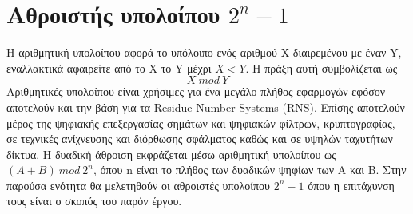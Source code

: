 \section{Αθροιστής υπολοίπου $2^n-1$}
\label{section:mod_addition}
Η αριθμητική υπολοίπου αφορά το υπόλοιπο ενός αριθμού X διαιρεμένου με έναν Y, εναλλακτικά
αφαιρείτε από το Χ το Y μέχρι $X < Y$. Η πράξη αυτή συμβολίζεται ως 
\begin{equation*}
    X\ mod\ Y
\end{equation*}
Αριθμητικές υπολοίπου είναι χρήσιμες για ένα μεγάλο πλήθος εφαρμογών εφόσον αποτελούν και 
την βάση για τα Residue Number Systems (RNS). Επίσης αποτελούν μέρος της ψηφιακής
επεξεργασίας σημάτων και ψηφιακών φίλτρων, κρυπτογραφίας, σε τεχνικές ανίχνευσης και διόρθωσης σφάλματος καθώς και σε υψηλών ταχυτήτων δίκτυα. Η δυαδική άθροιση εκφράζεται μέσω αριθμητική υπολοίπου ως $(A+B)\ mod\ 2^n$, όπου n είναι το πλήθος των δυαδικών ψηφίων των A και B. Στην παρούσα ενότητα θα μελετηθούν οι αθροιστές υπολοίπου $2^n-1$ όπου η επιτάχυνση τους είναι ο σκοπός του παρόν έργου.






